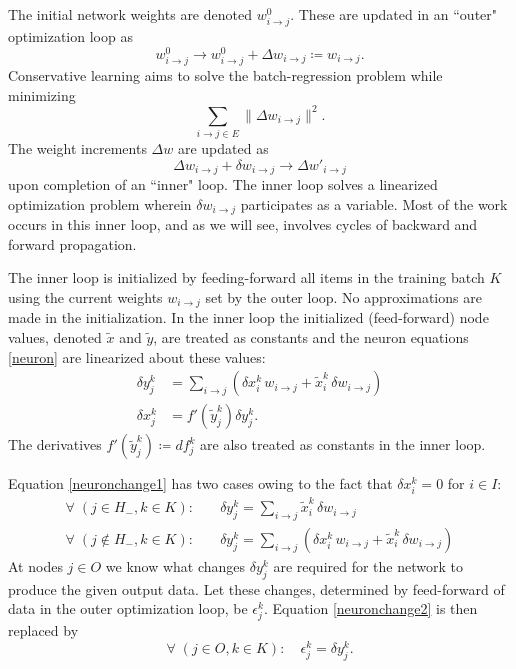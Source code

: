 \documentclass[12pt]{article}
\begin{document}
The initial network weights are denoted $w^0_{i\to j}$. These are updated in an ``outer" optimization loop as
\begin{equation}
w^0_{i\to j}\to w^0_{i\to j}+\Delta w_{i\to j}\coloneqq w_{i\to j}.
\end{equation}
Conservative learning aims to solve the batch-regression problem while minimizing
\begin{equation}\label{objective}
\sum_{i\to j\in E}\|\Delta w_{i\to j}\|^2.
\end{equation}
The weight increments $\Delta w$ are updated as
\begin{equation}\label{outerupdate}
\Delta w_{i\to j}+\delta w_{i\to j}\to \Delta w'_{i\to j}
\end{equation}
upon completion of an ``inner" loop. The inner loop solves a linearized optimization problem wherein $\delta w_{i\to j}$ participates as a variable. Most of the work occurs in this inner loop, and as we will see, involves cycles of backward and forward propagation.

The inner loop is initialized by feeding-forward all items in the training batch $K$ using the current weights $w_{i\to j}$ set by the outer loop. No approximations are made in the initialization. In the inner loop the initialized (feed-forward) node values, denoted $\tilde{x}$ and $\tilde{y}$, are treated as constants and the neuron equations \eqref{neuron} are linearized about these values:
\begin{subequations}
\begin{align}
\delta y^k_j&=\sum_{i\to j} \left(\delta x^k_i\,w_{i\to j}+\tilde{x}^k_i\, \delta w_{i \to j}\right)\label{neuronchange1}\\
\delta x^k_j&=f'(\tilde{y}^k_j)\delta y^k_j.\label{neuronchange2}
\end{align}
\end{subequations}
The derivatives $f'(\tilde{y}^k_j)\coloneqq df^k_j$ are also treated as constants in the inner loop.

Equation \eqref{neuronchange1} has two cases owing to the fact that $\delta x^k_i=0$ for $i\in I$:
\begin{subequations}\label{eqn1}
\begin{align}
\forall\; (j\in H_-, k\in K):\quad&\delta y^k_j=\sum_{i\to j}\tilde{x}^k_i\, \delta w_{i \to j}\label{eqn1a}\\
\forall\; (j\notin H_-, k\in K):\quad&\delta y^k_j=\sum_{i\to j} \left(\delta x^k_i\,w_{i\to j}+\tilde{x}^k_i\, \delta w_{i \to j}\right)\label{eqn1b}
\end{align}
\end{subequations}
At nodes $j\in O$ we know what changes $\delta y^k_j$ are required for the network to produce the given output data. Let these changes, determined by feed-forward  of data in the outer optimization loop, be $\epsilon^k_j$. Equation \eqref{neuronchange2} is then replaced by
\begin{equation}
\forall\; (j\in O, k\in K):\quad \epsilon^k_j=\delta y^k_j.\label{eqn2b}
\end{equation}
\end{document}
